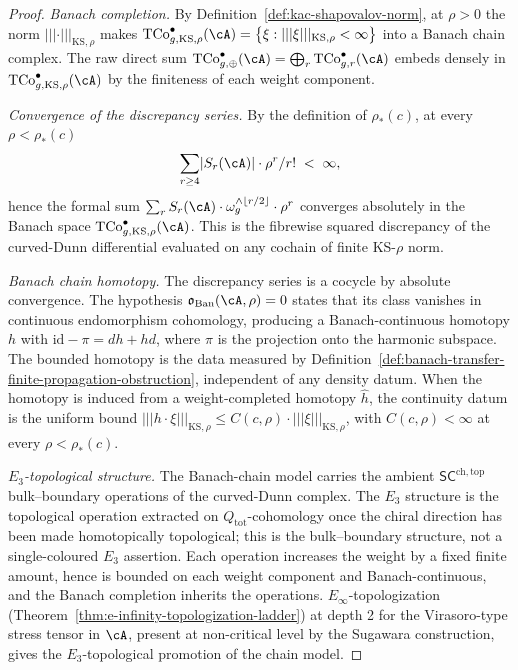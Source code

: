 \begin{proof}
\emph{Banach completion.}
By Definition~\ref{def:kac-shapovalov-norm}, at $\rho > 0$ the norm
$\lvert\lvert\lvert \cdot \rvert\rvert\rvert_{\mathrm{KS}, \rho}$
makes
$\mathrm{TCo}^{\bullet}_{g, \mathrm{KS}, \rho}(\cA) =
\bigl\{ \xi : \lvert\lvert\lvert \xi \rvert\rvert\rvert_{\mathrm{KS}, \rho}
< \infty \bigr\}$
into a Banach chain complex. The raw direct sum
$\mathrm{TCo}^{\bullet}_{g, \oplus}(\cA) = \bigoplus_r
\mathrm{TCo}^{\bullet}_{g, r}(\cA)$ embeds densely in
$\mathrm{TCo}^{\bullet}_{g, \mathrm{KS}, \rho}(\cA)$ by the
finiteness of each weight component.

\emph{Convergence of the discrepancy series.}
By the definition of $\rho_*(c)$, at every $\rho < \rho_*(c)$
\[
 \sum_{r \ge 4}
 \lvert S_r(\cA) \rvert \cdot \rho^r / r!
 \;<\; \infty,
\]
hence the formal sum $\sum_r S_r(\cA) \cdot \omega_g^{\wedge \lfloor r/2 \rfloor}
\cdot \rho^r$ converges absolutely in the Banach space
$\mathrm{TCo}^{\bullet}_{g, \mathrm{KS}, \rho}(\cA)$. This is the
fibrewise squared discrepancy of the curved-Dunn differential
evaluated on any cochain of finite KS-$\rho$ norm.

\emph{Banach chain homotopy.}
The discrepancy series is a cocycle by absolute convergence. The hypothesis
$\mathfrak{o}_{\mathrm{Ban}}(\cA,\rho)=0$ states that its class
vanishes in continuous endomorphism cohomology, producing a
Banach-continuous homotopy $h$ with
$\mathrm{id} - \pi = d h + h d$, where $\pi$ is the projection onto
the harmonic subspace. The bounded homotopy is the data measured by
Definition~\ref{def:banach-transfer-finite-propagation-obstruction},
independent of any density datum. When the homotopy is induced from a
weight-completed homotopy $\hat h$, the continuity datum is the
uniform bound
$\lvert\lvert\lvert h \cdot \xi \rvert\rvert\rvert_{\mathrm{KS}, \rho}
\le C(c, \rho) \cdot \lvert\lvert\lvert \xi \rvert\rvert\rvert_{\mathrm{KS}, \rho}$,
with $C(c, \rho) < \infty$ at every $\rho < \rho_*(c)$.

\emph{$E_3$-topological structure.}
The Banach-chain model carries the ambient
$\mathsf{SC}^{\mathrm{ch,top}}$ bulk--boundary operations of the
curved-Dunn complex. The $E_3$ structure is the topological operation
extracted on $Q_{\mathrm{tot}}$-cohomology once the chiral direction
has been made homotopically topological; this is the bulk--boundary
structure, not a single-coloured $E_3$ assertion. Each operation
increases the weight by a fixed finite amount, hence is bounded on
each weight component and Banach-continuous, and the Banach completion
inherits the operations.
$E_\infty$-topologization
(Theorem~\ref{thm:e-infinity-topologization-ladder}) at depth 2 for
the Virasoro-type stress tensor in $\cA$, present at non-critical
level by the Sugawara construction, gives the $E_3$-topological
promotion of the chain model.


\end{proof}
